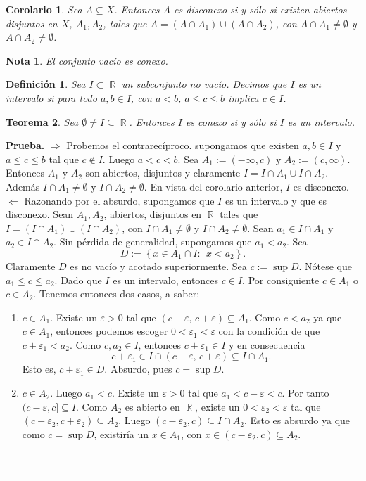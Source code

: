 \documentclass[x11names, 12pt]{book}
\newtheorem{definicion}{Definición}
\newtheorem{teorema}{Teorema}
\newtheorem{corolario}[teorema] {Corolario}
\newtheorem{remark}{Nota}
\newenvironment{prueba}[1][Prueba]{\noindent\textbf{#1.} }{\ \rule{0.5em}{0.5em}}
\DeclareMathOperator{\R}{\mathbb{R}}
\begin{document}
\begin{corolario}
Sea $A\subseteq X$. Entonces $A$ es disconexo si y sólo si existen abiertos disjuntos en $X$, $A_1, A_2$, tales que $A=(A\cap A_1)\cup (A\cap A_2)$, con $A\cap A_1\neq \emptyset$ y $A\cap A_2\neq \emptyset$.
\end{corolario}

\begin{remark}
El conjunto vacío es conexo.
\end{remark}

\begin{definicion}
Sea $I\subset \R$ un subconjunto no vacío. Decimos que $I$ es un intervalo si para todo $a,b\in I$, con $a<b$, $a\leq c\leq b$ implica $c\in I$.
\end{definicion}

\begin{teorema}\label{conx-int-R}
Sea $\emptyset \neq I\subseteq \R$. Entonces $I$ es conexo si y sólo si $I$ es un intervalo.
\end{teorema}
\begin{prueba}
$\Rightarrow$  Probemos el contrarecíproco. supongamos que existen $a,b \in I$ y $a\leq c\leq b$ tal que $c\notin I$. Luego $a<c<b$. Sea $A_1:=(-\infty, c) $ y $A_2:=( c, \infty) $. Entonces $A_1$ y $A_2$ son abiertos, disjuntos y claramente $I=I\cap A_1 \cup I\cap A_2$. Además $I\cap A_1\neq \emptyset$ y $I\cap A_2\neq \emptyset$. En vista del corolario anterior, $I$ es disconexo.\\
$\Leftarrow$ Razonando por el absurdo, supongamos que $I$ es un intervalo y que es disconexo. Sean $A_1, A_2$, abiertos, disjuntos en $\R$ tales que $I=(I\cap A_1 )\cup  (I \cap A_2)$, con $ I\cap A_1 \neq \emptyset$ y $ I\cap A_2 \neq \emptyset$. Sean $a_1 \in I\cap A_1$ y $a_2 \in I\cap A_2$. Sin pérdida de generalidad, supongamos que $a_1 <a_2$. Sea \[D:=\left\{ x\in A_1 \cap I : \ \ x<a_2\right\}.\]
Claramente $D$ es no vacío y acotado superiormente. Sea $c:=\sup D$. Nótese que $a_1 \leq c\leq a_2 .$ Dado que $I$ es un intervalo, entonces $c\in I.$ Por consiguiente $c\in A_1$ o $c\in A_2$. Tenemos entonces dos casos, a saber:
\begin{enumerate}
    \item $c\in A_1$. Existe un $\varepsilon >0$ tal que $(c-\varepsilon, \, c+\varepsilon) \subseteq A_1$. Como $c<a_2$ ya que  $c\in A_1$, entonces podemos escoger $0<\varepsilon_1 <\varepsilon$ con la condición de que $c+\varepsilon_1 <a_2$. Como $c,a_2\in I$, entonces $c+\varepsilon_1 \in I$ y en consecuencia
    \[ c+\varepsilon_1 \in I \cap  (c-\varepsilon, \, c+\varepsilon) \subseteq I\cap A_1.\]
    Esto es, $c+\varepsilon_1 \in D$. Absurdo, pues $c=\sup D$.
    \item $c\in A_2$. Luego $a_1 <c.$ Existe un $\varepsilon >0 $ tal que $a_1 <c-\varepsilon <c$. Por tanto $(c-\varepsilon , c]\subseteq I$. Como $A_2$ es abierto en $\R$, existe un $0<\varepsilon_2 <\varepsilon$ tal que $(c-\varepsilon_2, c+\varepsilon_2)\subseteq A_2$. Luego $(c-\varepsilon_2, c) \subseteq I\cap A_2$. Esto es absurdo ya que como $c=\sup D$, existiría un $x\in A_1$, con $x\in (c-\varepsilon_2, c) \subseteq A_2.$
\end{enumerate}
\end{prueba}
\end{document}
